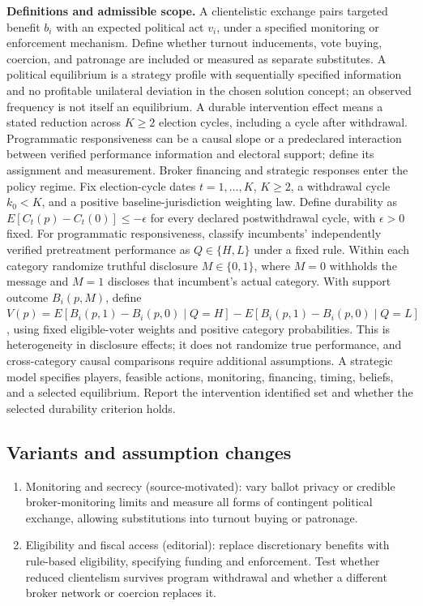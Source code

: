 \documentclass[11pt,a4paper]{article}
\begin{document}
\textbf{Definitions and admissible scope.} A clientelistic exchange pairs targeted benefit \(b_i\) with an expected political act \(v_i\), under a specified monitoring or enforcement mechanism. Define whether turnout inducements, vote buying, coercion, and patronage are included or measured as separate substitutes. A political equilibrium is a strategy profile with sequentially specified information and no profitable unilateral deviation in the chosen solution concept; an observed frequency is not itself an equilibrium. A durable intervention effect means a stated reduction across \(K\ge2\) election cycles, including a cycle after withdrawal. Programmatic responsiveness can be a causal slope or a predeclared interaction between verified performance information and electoral support; define its assignment and measurement. Broker financing and strategic responses enter the policy regime. Fix election-cycle dates \(t=1,\ldots,K\), \(K\ge2\), a withdrawal cycle \(k_0<K\), and a positive baseline-jurisdiction weighting law. Define durability as \(E[C_t(p)-C_t(0)]\le-\epsilon\) for every declared postwithdrawal cycle, with \(\epsilon>0\) fixed. For programmatic responsiveness, classify incumbents' independently verified pretreatment performance as \(Q\in\{H,L\}\) under a fixed rule. Within each category randomize truthful disclosure \(M\in\{0,1\}\), where \(M=0\) withholds the message and \(M=1\) discloses that incumbent's actual category. With support outcome \(B_i(p,M)\), define \(V(p)=E[B_i(p,1)-B_i(p,0)\mid Q=H]-E[B_i(p,1)-B_i(p,0)\mid Q=L]\), using fixed eligible-voter weights and positive category probabilities. This is heterogeneity in disclosure effects; it does not randomize true performance, and cross-category causal comparisons require additional assumptions. A strategic model specifies players, feasible actions, monitoring, financing, timing, beliefs, and a selected equilibrium. Report the intervention identified set and whether the selected durability criterion holds.
\subsection*{Variants and assumption changes}
\begin{enumerate}
\item Monitoring and secrecy (source-motivated): vary ballot privacy or credible broker-monitoring limits and measure all forms of contingent political exchange, allowing substitutions into turnout buying or patronage.
\item Eligibility and fiscal access (editorial): replace discretionary benefits with rule-based eligibility, specifying funding and enforcement. Test whether reduced clientelism survives program withdrawal and whether a different broker network or coercion replaces it.
\end{enumerate}
\end{document}
